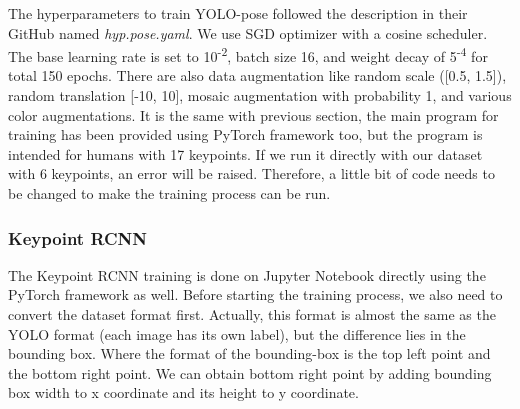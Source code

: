 



The hyperparameters to train YOLO-pose followed the description in their GitHub named \emph{hyp.pose.yaml}.
We use SGD optimizer with a cosine scheduler. The base learning rate is set to 10\textsuperscript{-2}, batch size 16,
and weight decay of 5\textsuperscript{-4} for total 150 epochs. There are also data augmentation like random scale ([0.5, 1.5]),
random translation [-10, 10], mosaic augmentation with probability 1, and various color augmentations.
It is the same with previous section, the main program for training has been provided using PyTorch framework too, but the program is intended for humans with 17 keypoints.
If we run it directly with our dataset with 6 keypoints, an error will be raised. Therefore, a little bit of code needs to be changed to make the training process can be run.

\subsubsection{Keypoint RCNN}
\label{subsubsec:training-rcnn}

The Keypoint RCNN training is done on Jupyter Notebook directly using the PyTorch framework as well.
Before starting the training process, we also need to convert the dataset format first.
Actually, this format is almost the same as the YOLO format (each image has its own label), but the difference lies in the bounding box.
Where the format of the bounding-box is the top left point and the bottom right point. We can obtain bottom right point by adding bounding box width to x coordinate and its height to y coordinate.

